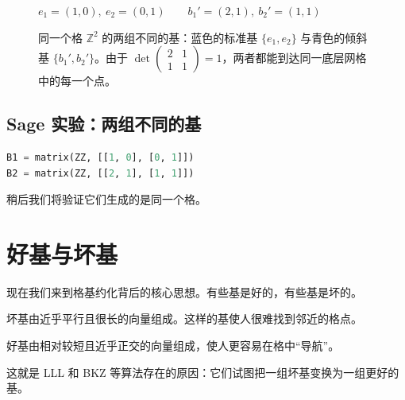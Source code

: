 \begin{figure}[H]
\centering
{}

{\small\centering $e_1=(1,0),\ e_2=(0,1) \qquad b_1'=(2,1),\ b_2'=(1,1)$\par}
\vspace{2pt}
\caption{同一个格 $\mathbb{Z}^2$ 的两组不同的基：蓝色的标准基 $\{e_1,e_2\}$ 与青色的倾斜基 $\{b_1',b_2'\}$。由于 $\det\left(\begin{smallmatrix}2&1\\1&1\end{smallmatrix}\right)=1$，两者都能到达同一底层网格中的每一个点。}
\label{fig:lattice-two-bases}
\end{figure}

\subsection{Sage 实验：两组不同的基}

\begin{lstlisting}[language=Python]
B1 = matrix(ZZ, [[1, 0], [0, 1]])
B2 = matrix(ZZ, [[2, 1], [1, 1]])
\end{lstlisting}

稍后我们将验证它们生成的是同一个格。

\section{好基与坏基}
现在我们来到格基约化背后的核心思想。有些基是好的，有些基是坏的。

坏基由近乎平行且很长的向量组成。这样的基使人很难找到邻近的格点。

好基由相对较短且近乎正交的向量组成，使人更容易在格中“导航”。

这就是 LLL 和 BKZ 等算法存在的原因：它们试图把一组坏基变换为一组更好的基。


